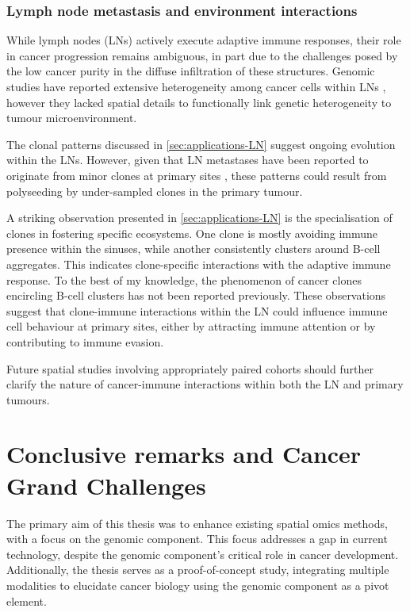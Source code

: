 \subsubsection*{Lymph node metastasis and environment interactions}

While lymph nodes (\acfp{LN}) actively execute adaptive immune responses, their role in cancer progression remains ambiguous, in part due to the challenges posed by the low cancer purity in the diffuse infiltration of these structures. Genomic studies have reported extensive heterogeneity among cancer cells within \acp{LN} \parencite{Pal2021-rf,Barry2018-el,Bao2018-kj}, however they lacked spatial details to functionally link genetic heterogeneity to tumour microenvironment.

The clonal patterns discussed in \cref{sec:applications-LN} suggest ongoing evolution within the \acp{LN}. However, given that \ac{LN} metastases have been reported to originate from minor clones at primary sites \parencite{Bao2018-kj}, these patterns could result from polyseeding by under-sampled clones in the primary tumour.

A striking observation presented in \cref{sec:applications-LN} is the specialisation of clones in fostering specific ecosystems. One clone is mostly avoiding immune presence within the sinuses, while another consistently clusters around B-cell aggregates. This indicates clone-specific interactions with the adaptive immune response. To the best of my knowledge, the phenomenon of cancer clones encircling B-cell clusters has not been reported previously. These observations suggest that clone-immune interactions within the \ac{LN} could influence immune cell behaviour at primary sites, either by attracting immune attention or by contributing to immune evasion.


Future spatial studies involving appropriately paired cohorts should further clarify the nature of cancer-immune interactions within both the \ac{LN} and primary tumours.

\section{Conclusive remarks and Cancer Grand Challenges}

The primary aim of this thesis was to enhance existing spatial omics methods, with a focus on the genomic component. This focus addresses a gap in current technology, despite the genomic component's critical role in cancer development. Additionally, the thesis serves as a proof-of-concept study, integrating multiple modalities to elucidate cancer biology using the genomic component as a pivot element. 

